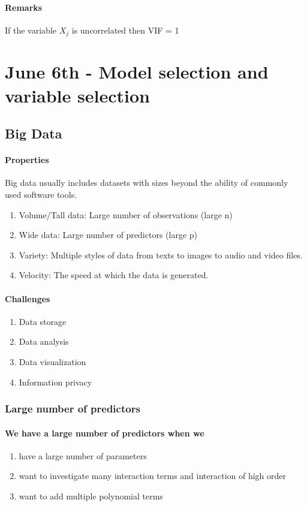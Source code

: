 \documentclass[11pt]{article}
\begin{document}
\paragraph{Remarks}
If the variable $X_j$ is uncorrelated then VIF = 1


\section{June 6th - Model selection and variable selection}
\subsection{Big Data}
\paragraph{Properties}
Big data usually includes datasets with sizes beyond the ability of commonly used software tools.
\begin{enumerate}
	\item Volume/Tall data: Large number of observations (large n)
	\item Wide data: Large number of predictors (large p)
	\item Variety: Multiple styles of data from texts to images to audio and video files.
	\item Velocity: The speed at which the data is generated.
\end{enumerate}
\paragraph{Challenges}
\begin{enumerate}
	\item Data storage
	\item Data analysis
	\item Data visualization
	\item Information privacy
\end{enumerate}

\subsubsection{Large number of predictors}
\paragraph{We have a large number of predictors when we}
\begin{enumerate}
	\item have a large number of parameters
	\item want to investigate many interaction terms and interaction of high order
	\item want to add multiple polynomial terms
\end{enumerate}
\end{document}
